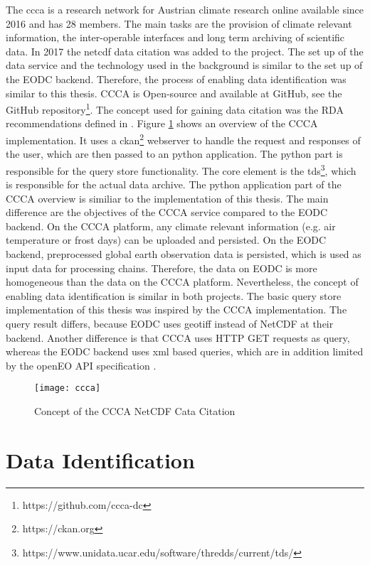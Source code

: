 \documentclass[draft,final]{vutinfth} %
\begin{document}
The \gls{ccca} is a research network for Austrian climate research online available since 2016 and has 28 members. The main tasks are the provision of climate relevant information, the inter-operable interfaces and long term archiving of scientific data. In 2017 the \gls{netcdf} data citation was added to the project. The set up of the data service and the technology used in the background is similar to the set up of the EODC backend. Therefore, the process of enabling data identification was similar to this thesis. CCCA is Open-source and available at GitHub, see the GitHub repository\footnote{https://github.com/ccca-dc}. The concept used for gaining data citation was the RDA recommendations defined in \cite{rauber2016identification}. Figure \ref{fig:ccca} shows an overview of the CCCA implementation. It uses a ckan\footnote{https://ckan.org} webserver to handle the request and responses of the user, which are then passed to an python application. The python part is responsible for the query store functionality. The core element is the \gls{tds}\footnote{https://www.unidata.ucar.edu/software/thredds/current/tds/}, which is responsible for the actual data archive.   
The python application part of the CCCA overview is similiar to the implementation of this thesis. The main difference are the objectives of the CCCA service compared to the EODC backend. On the CCCA platform, any climate relevant information (e.g. air temperature or frost days) can be uploaded and persisted. On the EODC backend, preprocessed global earth observation data is persisted, which is used as input data for processing chains. Therefore, the data on EODC is more homogeneous than the data on the CCCA platform. Nevertheless, the concept of enabling data identification is similar in both projects. The basic query store implementation of this thesis was inspired by the CCCA implementation. The query result differs, because EODC uses \gls{geotiff} instead of NetCDF at their backend. Another difference is that CCCA uses HTTP GET requests as query, whereas the EODC backend uses \gls{xml} based queries, which are in addition limited by the openEO API specification  \cite{ccca}.  

\begin{figure}[h]
	\centering
	\texttt{[image: ccca]}
	\caption{Concept of the CCCA NetCDF Cata Citation}
	\label{fig:ccca} %
\end{figure}

\section{Data Identification}\label{Data Identification}
\end{document}
